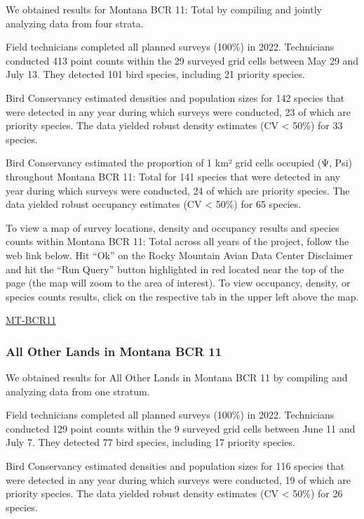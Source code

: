 \documentclass[
  letterpaper,
  DIV=11,
  numbers=noendperiod,
  oneside]{scrreprt}
\begin{document}
We obtained results for Montana BCR 11: Total by compiling and jointly
analyzing data from four strata.

Field technicians completed all planned surveys (100\%) in 2022.
Technicians conducted 413 point counts within the 29 surveyed grid cells
between May 29 and July 13. They detected 101 bird species, including 21
priority species.

Bird Conservancy estimated densities and population sizes for 142
species that were detected in any year during which surveys were
conducted, 23 of which are priority species. The data yielded robust
density estimates (CV \textless{} 50\%) for 33 species.

Bird Conservancy estimated the proportion of 1 km² grid cells occupied
(Ψ, Psi) throughout Montana BCR 11: Total for 141 species that were
detected in any year during which surveys were conducted, 24 of which
are priority species. The data yielded robust occupancy estimates (CV
\textless{} 50\%) for 65 species.

To view a map of survey locations, density and occupancy results and
species counts within Montana BCR 11: Total across all years of the
project, follow the web link below. Hit ``Ok'' on the Rocky Mountain
Avian Data Center Disclaimer and hit the ``Run Query'' button
highlighted in red located near the top of the page (the map will zoom
to the area of interest). To view occupancy, density, or species counts
results, click on the respective tab in the upper left above the map.

\href{http://www.rmbo.org/new_site/adc/QueryWindow.aspx\#N4IgzgrgDgpgTmALnAhoiBbEAuABCAWQBUBaAIQGEAlARhpAF8g=}{MT-BCR11}

\hypertarget{all-other-lands-in-montana-bcr-11}{%
\subsubsection{All Other Lands in Montana BCR
11}\label{all-other-lands-in-montana-bcr-11}}

We obtained results for All Other Lands in Montana BCR 11 by compiling
and analyzing data from one stratum.

Field technicians completed all planned surveys (100\%) in 2022.
Technicians conducted 129 point counts within the 9 surveyed grid cells
between June 11 and July 7. They detected 77 bird species, including 17
priority species.

Bird Conservancy estimated densities and population sizes for 116
species that were detected in any year during which surveys were
conducted, 19 of which are priority species. The data yielded robust
density estimates (CV \textless{} 50\%) for 26 species.
\end{document}
